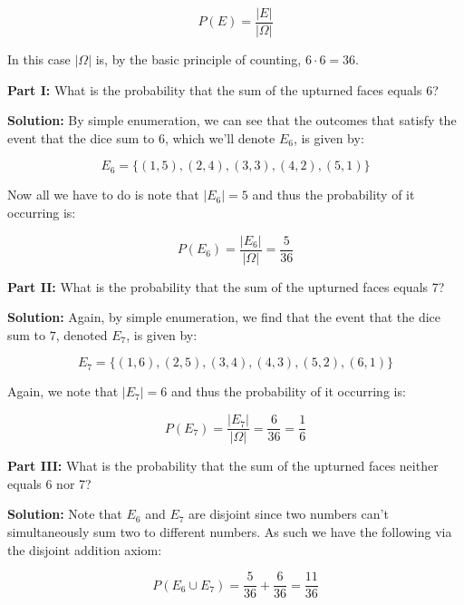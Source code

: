 \documentclass{article}
\begin{document}
\begin{equation*}
    P(E)=\frac{|E|}{|\Omega|}
\end{equation*}

In this case $|\Omega|$ is, by the basic principle of counting, $6\cdot6=36$.
\bigskip

\noindent\textbf{Part I:} What is the probability that the sum of the upturned faces equals 6?
\bigskip

\noindent\textbf{Solution:} By simple enumeration, we can see that the outcomes that satisfy the event that the dice sum to $6$, which we'll denote $E_6$, is given by:

\begin{equation*}
    E_6=\{(1,5),(2,4),(3,3),(4,2),(5,1)\}
\end{equation*}

Now all we have to do is note that $|E_6|=5$ and thus the probability of it occurring is:

\begin{equation*}
    P(E_6)=\frac{|E_6|}{|\Omega|}=\frac{5}{36}
\end{equation*}
\medskip

\noindent\textbf{Part II:} What is the probability that the sum of the upturned faces equals 7?
\bigskip

\noindent\textbf{Solution:} Again, by simple enumeration, we find that the event that the dice sum to $7$, denoted $E_7$, is given by:

\begin{equation*}
    E_7=\{(1,6),(2,5),(3,4),(4,3),(5,2),(6,1)\}
\end{equation*}

Again, we note that $|E_7|=6$ and thus the probability of it occurring is:

\begin{equation*}
    P(E_7)=\frac{|E_7|}{|\Omega|}=\frac{6}{36}=\frac{1}{6}
\end{equation*}
\medskip

\noindent\textbf{Part III:} What is the probability that the sum of the upturned faces neither equals 6 nor 7?
\bigskip

\noindent\textbf{Solution:} Note that $E_6$ and $E_7$ are disjoint since two numbers can't simultaneously sum two to different numbers. As such we have the following via the disjoint addition axiom:

\begin{equation*}
    P(E_6\cup E_7)=\frac{5}{36}+\frac{6}{36}=\frac{11}{36}
\end{equation*}
\end{document}
